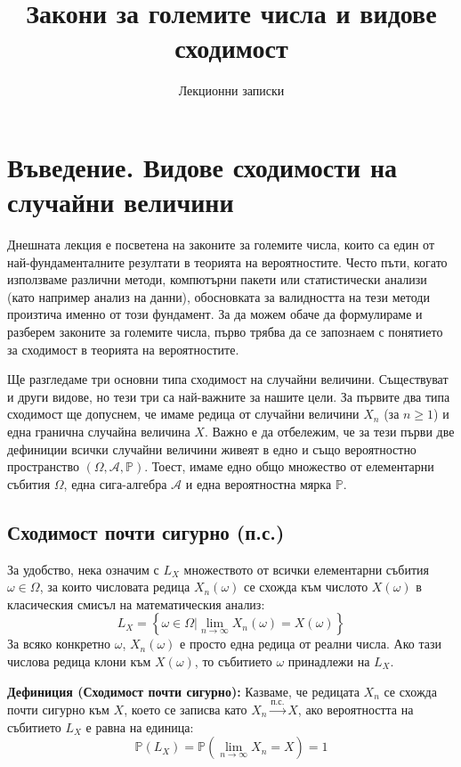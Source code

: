 \documentclass{article}
\title{Закони за големите числа и видове сходимост}
\author{Лекционни записки}
\date{}
\begin{document}
\maketitle

\section{Въведение. Видове сходимости на случайни величини}

Днешната лекция е посветена на законите за големите числа, които са един от най-фундаменталните резултати в теорията на вероятностите. Често пъти, когато използваме различни методи, компютърни пакети или статистически анализи (като например анализ на данни), обосновката за валидността на тези методи произтича именно от този фундамент. За да можем обаче да формулираме и разберем законите за големите числа, първо трябва да се запознаем с понятието за сходимост в теорията на вероятностите.

Ще разгледаме три основни типа сходимост на случайни величини. Съществуват и други видове, но тези три са най-важните за нашите цели. За първите два типа сходимост ще допуснем, че имаме редица от случайни величини $X_n$ (за $n \ge 1$) и една гранична случайна величина $X$. Важно е да отбележим, че за тези първи две дефиниции всички случайни величини живеят в едно и също вероятностно пространство $(\Omega, \mathcal{A}, \mathbb{P})$. Тоест, имаме едно общо множество от елементарни събития $\Omega$, една сига-алгебра $\mathcal{A}$ и една вероятностна мярка $\mathbb{P}$.

\subsection{Сходимост почти сигурно (п.с.)}

За удобство, нека означим с $L_X$ множеството от всички елементарни събития $\omega \in \Omega$, за които числовата редица $X_n(\omega)$ се схожда към числото $X(\omega)$ в класическия смисъл на математическия анализ:
\[
L_X = \left\{ \omega \in \Omega \mathrel{\bigg|} \lim_{n \to \infty} X_n(\omega) = X(\omega) \right\}
\]
За всяко конкретно $\omega$, $X_n(\omega)$ е просто една редица от реални числа. Ако тази числова редица клони към $X(\omega)$, то събитието $\omega$ принадлежи на $L_X$.

\textbf{Дефиниция (Сходимост почти сигурно):} Казваме, че редицата $X_n$ се схожда почти сигурно към $X$, което се записва като $X_n \xrightarrow{\text{п.с.}} X$, ако вероятността на събитието $L_X$ е равна на единица:
\[
\mathbb{P}(L_X) = \mathbb{P}\left( \lim_{n \to \infty} X_n = X \right) = 1
\]
\end{document}
